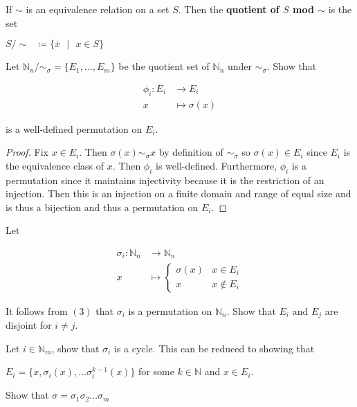 \documentclass{article}
\newenvironment{definition}[2][Definition]{\begin{trivlist}
\item[\hskip \labelsep {\emph{#1}}\hskip \labelsep {#2.}]}{\end{trivlist}}
\begin{document}
\begin{itemize}
    \begin{definition}
      \\If $\sim$ is an equivalence relation on a set $S$. Then the \textbf{quotient of $S$ mod $\sim$} is the set
      \begin{center}
        $S/\sim\text{ }\coloneq \{\overline{x}\text{ }\vert\text{ }x\in S\}$
      \end{center}
    \end{definition}
    \fi
    \item [3.]Let $\mathbb{N}_n/\sim_\sigma = \{E_1,\dots,E_m\}$ be the quotient set of $\mathbb{N}_n$ under $\sim_\sigma$. Show that 
    \begin{center}
    \begin{align*}
        \phi_i: E_i &\rightarrow E_i
        \\x &\mapsto \sigma(x)
    \end{align*}
    \end{center}
    is a well-defined permutation on $E_i$.
    \begin{proof}
      Fix $x\in E_i$. Then $\sigma(x) \sim_\sigma x$ by definition of $\sim_\sigma$ so $\sigma(x)\in E_i$ since $E_i$ is the equivalence class of $x$. Then $\phi_i$ is well-defined.
      Furthermore, $\phi_i$ is a permutation since it maintains injectivity because it is the restriction of an injection. Then this is an injection on a finite domain and range of equal size and is thus a bijection
      and thus a permutation on $E_i$. 
    \end{proof}
    \item [4.] Let 
    \begin{center}
    \begin{align*}
        \sigma_i: \mathbb{N}_n &\rightarrow \mathbb{N}_n
        \\x &\mapsto \begin{cases} 
      \sigma(x) & x\in E_i \\
      x & x\notin E_i
    \end{cases}
    \end{align*}
    \end{center}
    It follows from $(3)$ that $\sigma_i$ is a permutation on $\mathbb{N}_n$. Show that $E_i$ and $E_j$ are disjoint for $i\ne j$.
    \item [5.] Let $i\in\mathbb{N}_m$, show that $\sigma_i$ is a cycle. This can be reduced to showing that
    \begin{center}
        $E_i = \{x, \sigma_i(x), \dots \sigma_i^{k-1}(x)\}$ for some $k\in\mathbb{N}$ and $x\in E_i$.
    \end{center}
    \item [6.] Show that $\sigma = \sigma_1\sigma_2\dots\sigma_m$
    

\end{itemize}
\end{document}
